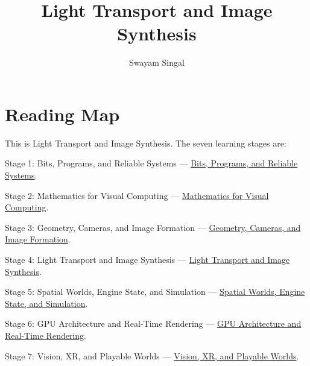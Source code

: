 \documentclass[11pt,twoside,openany]{book}
\title{Light Transport and Image Synthesis}
\author{Swayam Singal}
\begin{document}
\maketitle
\begin{center}\end{center}
\hypertarget{volume-reading-map}{}
\chapter*{Reading Map}
\noindent This is Light Transport and Image Synthesis. The seven learning stages are:
\par\noindent Stage 1: Bits, Programs, and Reliable Systems --- \href{../01-Bits-Programs-and-Reliable-Systems/main.pdf}{Bits, Programs, and Reliable Systems}.
\par\noindent Stage 2: Mathematics for Visual Computing --- \href{../02-Mathematics-for-Visual-Computing/main.pdf}{Mathematics for Visual Computing}.
\par\noindent Stage 3: Geometry, Cameras, and Image Formation --- \href{../03-Geometry-Cameras-and-Image-Formation/main.pdf}{Geometry, Cameras, and Image Formation}.
\par\noindent Stage 4: Light Transport and Image Synthesis --- \href{../04-Light-Transport-and-Image-Synthesis/main.pdf}{Light Transport and Image Synthesis}.
\par\noindent Stage 5: Spatial Worlds, Engine State, and Simulation --- \href{../05-Spatial-Worlds-Engine-State-and-Simulation/main.pdf}{Spatial Worlds, Engine State, and Simulation}.
\par\noindent Stage 6: GPU Architecture and Real-Time Rendering --- \href{../06-GPU-Architecture-and-Real-Time-Rendering/main.pdf}{GPU Architecture and Real-Time Rendering}.
\par\noindent Stage 7: Vision, XR, and Playable Worlds --- \href{../07-Vision-XR-and-Playable-Worlds/main.pdf}{Vision, XR, and Playable Worlds}.
\tableofcontents
\mainmatter
\setcounter{chapter}{0}











\label{stagechaptersend:04-Light-Transport-and-Image-Synthesis}
\appendix
\end{document}
